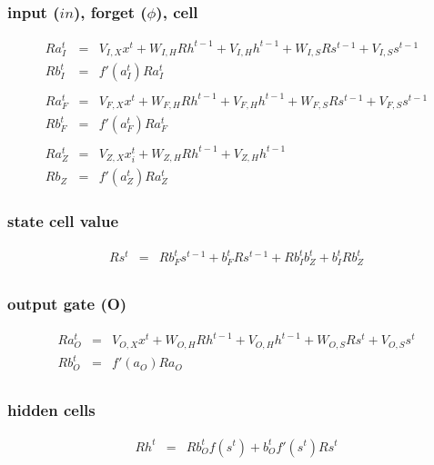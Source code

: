\documentclass{article}
\begin{document}
\subsubsection{input ($in$), forget ($\phi$), cell}
\begin{eqnarray*}
Ra_{I}^t &=& V_{I,X}x^t + W_{I,H}Rh^{t-1} + V_{I,H}h^{t-1} + W_{I,S}Rs^{t-1} + V_{I,S}s^{t-1}\\
Rb_{I}^t &=& f'(a_{I}^t)Ra_{I}^t \\
\\
Ra_{F}^t &=& V_{F, X}x^t + W_{F, H}Rh^{t-1} + V_{F, H}h^{t-1} + W_{F, S}Rs^{t-1} + V_{F, S}s^{t-1} \\
Rb_{F}^t &=& f'(a_{F}^t) Ra_{F}^t \\
\\
Ra_{Z}^t &=& V_{Z,X}x_i^t + W_{Z,H} Rh^{t-1} + V_{Z,H} h^{t-1} \\
Rb_{Z} &=& f'(a_{Z}^t) Ra_{Z}^t 
\end{eqnarray*}


\subsubsection{state cell value}
\begin{eqnarray*}
Rs^t &=& Rb_{F}^ts^{t-1} + b_{F}^tRs^{t-1} + Rb_{I}^t b_Z^t + b_{I}^t Rb_Z^t \\  
\end{eqnarray*}

\subsubsection{output gate (O)}
\begin{eqnarray*}
Ra_{O}^t &=& V_{O,X}x^t + W_{O,H}Rh^{t-1} + V_{O,H}h^{t-1} + W_{O,S}Rs^t + V_{O,S}s^t \\
Rb_{O}^t &=& f'(a_{O})Ra_{O} \\
\end{eqnarray*}

\subsubsection{hidden cells}
\begin{eqnarray*}
Rh^t &=& Rb_{O}^t f(s^t) + b_{O}^t f'(s^t)Rs^t \\
\end{eqnarray*}

\end{document}
